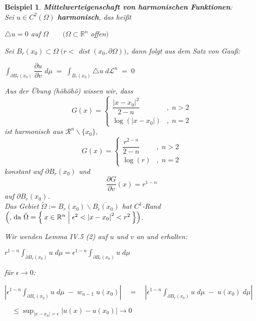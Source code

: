 \documentclass[11pt]{memoir}
\theoremstyle{changebreak}
\newtheorem{Beispiel}{Beispiel}[chapter]
\newcommand{\dom}{\partial\Omega}
\newcommand{\dudv}{\dfrac{\partial u}{\partial v}}
\begin{document}
\begin{Beispiel}
\emph{\textbf{Mittelwerteigenschaft von harmonischen Funktionen}}: \\
Sei $u \in C^2(\Omega)$ \textbf{harmonisch}, das heißt
\begin{center}
	$\triangle u = 0$ \quad auf $\Omega \qquad (\Omega \subset \mathbb R^n$ offen$)$
\end{center}
Sei $B_r(x_0) \subset \Omega \;(r < $ dist $(x_0, \dom))$, dann folgt aus dem Satz von Gauß:
\begin{center}
	$\int_{\partial B_r(x_0)} \dudv \; d\mu \; = \; \int_{B_r(x_0)} \triangle u \; d\mathscr L^n \; = \; 0$
\end{center}
Aus der Übung (höhöhö) wissen wir, dass
\begin{equation}
	G(x) =
	\begin{cases}
		\dfrac{\left | x - x_0 \right | ^2 }{2-n} & , \; n > 2 \\
		\log(\left | x - x_0 \right |) & ,\; n = 2
	\end{cases}
\end{equation}
ist harmonisch aus $\mathscr R^n\backslash \{x_0\}$,
\begin{equation}
	G(x) =
	\begin{cases}
		\dfrac{r^{2-n} }{2-n} & , \; n > 2 \\
		\log(r) & ,\; n = 2
	\end{cases}
\end{equation}
konstant auf $\partial B_r(x_0)$ und 
\begin{equation}
	\dfrac{\partial G}{\partial v} (x) = r^{1-n}
\end{equation}
auf $\partial B_r(x_0)$.\\
Das Gebiet $\tilde\Omega := B_r(x_0) \backslash \overline{B_\epsilon (x_0)}$ hat $C^1$-Rand $\left(\text{, da }\tilde\Omega = \Set{x \in \mathbb R^n| \epsilon^2 < \left |x-x_0\right |^2 < r^2}\right)$. 
\par\bigskip
Wir wenden Lemma IV.5 (2) auf $u$ und $v$ an und erhalten:
\par\bigskip
$r^{1-n} \int_{\partial B_r(x_0)} u \; d\mu = \epsilon^{1-n} \int_{\partial B_\epsilon (x_0)} u \; d\mu$
\par\bigskip
für $\epsilon \rightarrow 0$:
\par\bigskip
$\left | \epsilon^{1-n}  \int_{\partial B_r(x_0)} u \; d\mu \; - \; w_{n-1} \;u(x_0)\right | 
\quad = \quad 
\left | \epsilon^{1-n}  \int_{\partial B_r(x_0)} u \; d\mu \; -  \;u(x_0)\; d\mu \right | $
\par\bigskip
$\quad \leq \sup_{|x-x_0| = \epsilon} \left |u(x) - u(x_0)\right | \longrightarrow 0$


\end{Beispiel}
\end{document}
